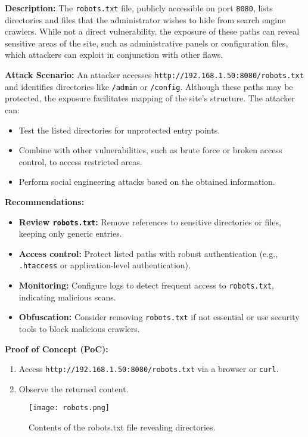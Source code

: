 \documentclass[a4paper,12pt]{article}
\begin{document}
\textbf{Description:}  
The \texttt{robots.txt} file, publicly accessible on port \texttt{8080}, lists directories and files that the administrator wishes to hide from search engine crawlers. While not a direct vulnerability, the exposure of these paths can reveal sensitive areas of the site, such as administrative panels or configuration files, which attackers can exploit in conjunction with other flaws.

\textbf{Attack Scenario:}  
An attacker accesses \texttt{http://192.168.1.50:8080/robots.txt} and identifies directories like \texttt{/admin} or \texttt{/config}. Although these paths may be protected, the exposure facilitates mapping of the site’s structure. The attacker can:  
\begin{itemize}
    \item Test the listed directories for unprotected entry points.  
    \item Combine with other vulnerabilities, such as brute force or broken access control, to access restricted areas.  
    \item Perform social engineering attacks based on the obtained information.  
\end{itemize}

\textbf{Recommendations:}  
\begin{itemize}
    \item \textbf{Review \texttt{robots.txt}:} Remove references to sensitive directories or files, keeping only generic entries.  
    \item \textbf{Access control:} Protect listed paths with robust authentication (e.g., \texttt{.htaccess} or application-level authentication).  
    \item \textbf{Monitoring:} Configure logs to detect frequent access to \texttt{robots.txt}, indicating malicious scans.  
    \item \textbf{Obfuscation:} Consider removing \texttt{robots.txt} if not essential or use security tools to block malicious crawlers.  
\end{itemize}

\textbf{Proof of Concept (PoC):}  
\begin{enumerate}
    \item Access \texttt{http://192.168.1.50:8080/robots.txt} via a browser or \texttt{curl}.  
    \item Observe the returned content.
\end{enumerate}

\begin{figure}[ht]
    \centering
    \texttt{[image: robots.png]}
    \caption{Contents of the robots.txt file revealing directories.}
\end{figure}
\end{document}
